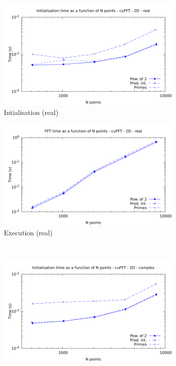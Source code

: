\documentclass[12pt, a4paper]{article}
\begin{document}
\begin{figure}[H]
\captionsetup{width=0.8\linewidth}
\centering
\begin{subfigure}{.5\textwidth}
\centering
\includegraphics[width=.9\linewidth]{graphs/fft-cuda-2d-pow2-r-init.pdf}
\caption{Intialisation (real)}
\label{FFTCUDA2DRI}
\end{subfigure}%
\begin{subfigure}{.5\textwidth}
\centering
\includegraphics[width=.9\linewidth]{graphs/fft-cuda-2d-pow2-r-exec.pdf}
\caption{Execution (real)}
\label{FFTCUDA2DRE}
\end{subfigure}\\
\begin{subfigure}{.5\textwidth}
\centering
\includegraphics[width=.9\linewidth]{graphs/fft-cuda-2d-pow2-c-init.pdf}

\end{subfigure}
\end{figure}
\end{document}
